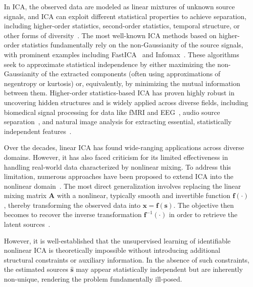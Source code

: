 \documentclass{article}
\begin{document}
In ICA, the observed data are modeled as linear mixtures of unknown source signals, and ICA can exploit different statistical properties to achieve separation, including higher-order statistics, second-order statistics, temporal structure, or other forms of diversity~\cite{hyvarinen1999fast,bell1995information,Adali14IEE}. The most well-known ICA methods based on higher-order statistics fundamentally rely on the non-Gaussianity of the source signals, with prominent examples including FastICA~\cite{hyvarinen1999fast} and Infomax~\cite{bell1995information}. These algorithms seek to approximate statistical independence by either maximizing the non-Gaussianity of the extracted components (often using approximations of negentropy or kurtosis) or, equivalently, by minimizing the mutual information between them. Higher-order statistics-based ICA has proven highly robust in uncovering hidden structures and is widely applied across diverse fields, including biomedical signal processing for data like fMRI and EEG~\cite{Calhoun2009ARO, Yuhui20, Correa05gift}, audio source separation~\cite{Makino04, Sattar01}, and natural image analysis for extracting essential, statistically independent features~\cite{Hateren99,Hyvarinen2009}.

Over the decades, linear ICA has found wide-ranging applications across diverse domains. However, it has also faced criticism for its limited effectiveness in handling real-world data characterized by nonlinear mixing. To address this limitation, numerous approaches have been proposed to extend ICA into the nonlinear domain~\cite{hyvarinen1999nonlinear, Aapo23PATTERN}. The most direct generalization involves replacing the linear mixing matrix $\mathbf{A}$ with a nonlinear, typically smooth and invertible function $\mathbf{f}(\cdot)$, thereby transforming the observed data into $\mathbf{x} = \mathbf{f}(\mathbf{s})$. The objective then becomes to recover the inverse transformation $\mathbf{f}^{-1}(\cdot)$ in order to retrieve the latent sources~\cite{Sorrenson2020Disentanglement,khemakhem20a,Almeida02}.

However, it is well-established that the unsupervised learning of identifiable nonlinear ICA is theoretically impossible without introducing additional structural constraints or auxiliary information. In the absence of such constraints, the estimated sources $\hat{\mathbf{s}}$ may appear statistically independent but are inherently non-unique, rendering the problem fundamentally ill-posed.
\end{document}
